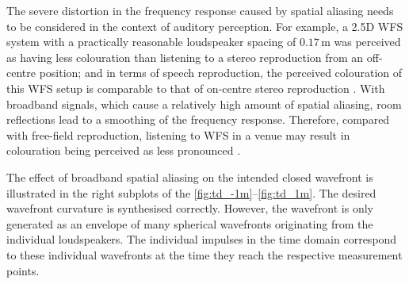The severe distortion in the frequency response caused by spatial
aliasing needs to be considered in the context of auditory perception.
%
For example, a 2.5D WFS system with a practically reasonable loudspeaker
spacing of $0.17$\,m was perceived as having less colouration than listening
to a stereo reproduction from an off-centre position; and
in terms of speech reproduction, the perceived colouration of this
WFS setup is comparable to that of on-centre stereo reproduction
\cite{Wierstorf2014_diss}.
%
With broadband signals, which cause a relatively high amount of spatial
aliasing, room reflections lead to a smoothing of the frequency response.
Therefore, compared with free-field reproduction, listening to WFS in a venue may
result in colouration being perceived as less pronounced \cite{Erbes2020_diss}.



The effect of broadband spatial aliasing on the intended closed
wavefront is illustrated in the right subplots of the
\myfigs\ref{fig:td_-1m}--\ref{fig:td_1m}.
%
The desired wavefront curvature is synthesised correctly.
However, the wavefront is only generated as an envelope of many spherical
wavefronts originating from the individual loudspeakers.
%
The individual impulses in the time domain correspond to these individual
wavefronts at the time they reach the respective measurement points.



